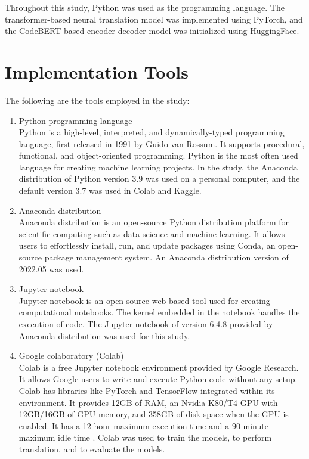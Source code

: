 Throughout this study, Python was used as the programming language. The transformer-based neural translation model was implemented using PyTorch, and the CodeBERT-based encoder-decoder model was initialized using HuggingFace.

\section{Implementation Tools}
The following are the tools employed in the study:
\begin{enumerate}[topsep = 0pt, label=\roman*.]
\item Python programming language \\
Python is a high-level, interpreted, and dynamically-typed programming language, first released in 1991 by Guido van Rossum. It supports procedural, functional, and object-oriented programming. Python is the most often used language for creating machine learning projects. In the study, the Anaconda distribution of Python version 3.9 was used on a personal computer, and the default version 3.7 was used in Colab and Kaggle.

\item Anaconda distribution \\
Anaconda distribution is an open-source Python distribution platform for scientific computing such as data science and machine learning. It allows users to effortlessly install, run, and update packages using Conda, an open-source package management system. An Anaconda distribution version of 2022.05 was used.

\item Jupyter notebook \\
Jupyter notebook is an open-source web-based tool used for creating computational notebooks. The kernel embedded in the notebook handles the execution of code. The Jupyter notebook of version 6.4.8 provided by Anaconda distribution was used for this study.

\item Google colaboratory (Colab) \\
Colab is a free Jupyter notebook environment provided by Google Research. It allows Google users to write and execute Python code without any setup. Colab has libraries like PyTorch and TensorFlow integrated within its environment. It provides 12GB of RAM, an Nvidia K80/T4 GPU with 12GB/16GB of GPU memory, and 358GB of disk space when the GPU is enabled. It has a 12 hour maximum execution time and a 90 minute maximum idle time \cite{kazemnejad_2019}. Colab was used to train the models, to perform translation, and to evaluate the models.


\end{enumerate}

